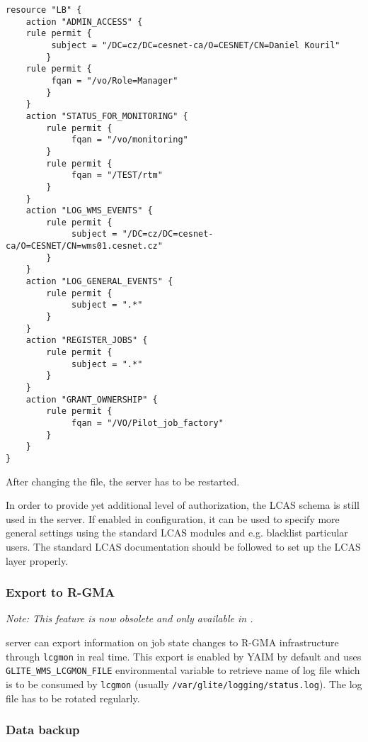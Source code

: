 \begin{lstlisting}
resource "LB" {
    action "ADMIN_ACCESS" {
	rule permit {
	     subject = "/DC=cz/DC=cesnet-ca/O=CESNET/CN=Daniel Kouril"
        }
	rule permit {
	     fqan = "/vo/Role=Manager"
        }
    }
    action "STATUS_FOR_MONITORING" {
        rule permit {
             fqan = "/vo/monitoring"
        }
        rule permit {
             fqan = "/TEST/rtm"
        }
    }
    action "LOG_WMS_EVENTS" {
        rule permit {
             subject = "/DC=cz/DC=cesnet-ca/O=CESNET/CN=wms01.cesnet.cz"
        }
    }
    action "LOG_GENERAL_EVENTS" {
        rule permit {
             subject = ".*"
        }
    }
    action "REGISTER_JOBS" {
        rule permit {
             subject = ".*"
        }
    }
    action "GRANT_OWNERSHIP" {
        rule permit {
             fqan = "/VO/Pilot_job_factory"
        }
    }
}
\end{lstlisting}

After changing the file, the server has to be restarted.

In order to provide yet additional level of authorization, the LCAS
schema\cite{lcas} is still used in the server. If enabled in configuration,
it can be used to specify more general settings using the standard LCAS
modules and e.g. blacklist particular users. The standard LCAS documentation
should be followed to set up the LCAS layer properly.


\subsubsection{Export to R-GMA}

\emph{Note: This feature is now obsolete and only available in .}

{\sloppy
\LB server can export information on job state changes to R-GMA infrastructure through \verb'lcgmon' 
in real time. This export is enabled by YAIM by default and uses \verb'GLITE_WMS_LCGMON_FILE' 
environmental variable to retrieve name of log file which is to be consumed by \verb'lcgmon' (usually
\verb'/var/glite/logging/status.log'). The log file has to be rotated regularly.

}

\subsubsection{Data backup}
\label{inst:backup}

